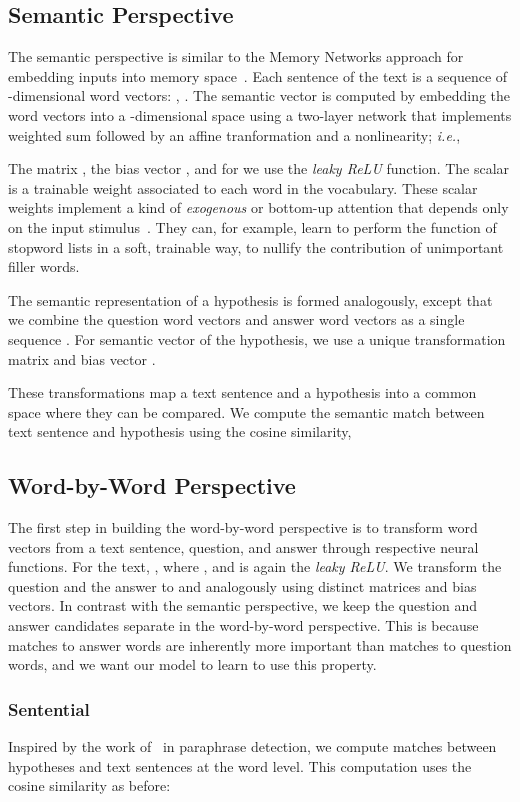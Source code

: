 \documentclass[11pt]{article}
\begin{document}
\subsection{Semantic Perspective}
The semantic perspective is similar to the Memory Networks approach for embedding inputs into memory space~\cite{weston2014}. Each sentence of the text is a sequence of -dimensional word vectors: , . The semantic vector  is computed by embedding the word vectors into a -dimensional space using a two-layer network that implements weighted sum followed by an affine tranformation and a nonlinearity; {\it i.e.},

The matrix , the bias vector , and for  we use the {\it leaky ReLU} function. The scalar  is a trainable weight associated to each word in the vocabulary. These scalar weights implement a kind of {\it exogenous} or bottom-up attention that depends only on the input stimulus~\cite{mayer2004}. They can, for example, learn to perform the function of stopword lists in a soft, trainable way, to nullify the contribution of unimportant filler words.

The semantic representation of a hypothesis is formed analogously, except that we combine the question word vectors  and answer word vectors  as a single sequence . For semantic vector  of the hypothesis, we use a unique transformation matrix  and bias vector .

These transformations map a text sentence and a hypothesis into a common space where they can be compared. We compute the semantic match between text sentence and hypothesis using the cosine similarity,


\subsection{Word-by-Word Perspective}
The first step in building the word-by-word perspective is to transform word vectors from a text sentence, question, and answer through respective neural functions. For the text, , where ,  and  is again the {\it leaky ReLU}. We transform the question and the answer to  and  analogously using distinct matrices and bias vectors. In contrast with the semantic perspective, we keep the question and answer candidates separate in the word-by-word perspective. This is because matches to answer words are inherently more important than matches to question words, and we want our model to learn to use this property.

\subsubsection{Sentential}
Inspired by the work of~ in paraphrase detection, we compute matches between hypotheses and text sentences at the word level. This computation uses the cosine similarity as before:
\end{document}
